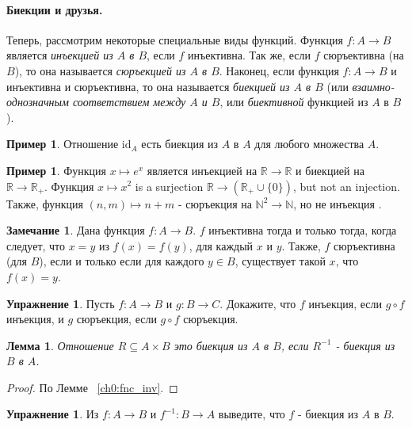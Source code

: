 \documentclass[12pt,notitlepage]{article}
\theoremstyle{plain}
\newtheorem{lemma}[thm]{Лемма}
\theoremstyle{definition}
\newtheorem{exc}[thm]{Упражнение}
\newtheorem{exm}[thm]{Пример}
\newtheorem{rem}[thm]{Замечание}
\theoremstyle{plain}
\newcommand{\N}{\mathbb{N}}
\newcommand{\R}{\mathbb{R}}
\newcommand{\sbs}{\subseteq}
\newcommand{\id}{\mathrm{id}}
\newcommand{\1}{\mathbf{1}}
\newcommand{\0}{\mathbf{0}}
\newcommand{\mcomm}[1]{}
\begin{document}
\paragraph{Биекции и друзья.} Теперь, рассмотрим некоторые специальные виды функций. Функция $f\colon A \to B$ является \emph{инъекцией из $A$ в $B$}, если $f$ инъективна. Так же, если $f$ сюръективна (на $B$), то она называется \emph{сюръекцией из $A$ в $B$}. Наконец, если функция $f\colon A \to B$ и инъективна и сюръективна, то она называется \emph{биекцией из $A$ в $B$} (или \emph{взаимно-однозначным соответствием между $A$ и $B$}, или \emph{биективной} функцией из $A$ в $B$).

\begin{exm}
	Отношение $\id_A$ есть биекция из $A$ в $A$ для любого множества $A$.
\end{exm}

\begin{exm}
	Функция $x \mapsto e^x$ является инъекцией на $\R \to \R$ и биекцией на $\R \to \R_+$. Функция $x \mapsto x^2$ is a surjection $\R \to (\R_+ \cup \{0\})$, but not an injection. Также, функция $(n,m) \mapsto n + m$ - сюръекция на $\N^2 \to \N$, но не инъекция . 
\end{exm}

\begin{rem}
	Дана функция $f\colon A \to B$. $f$ инъективна тогда и только тогда, когда следует, что $x = y$ из $f(x) = f(y)$, для каждый $x$ и $y$. Также, $f$ сюръективна (для $B$), если и только если для каждого $y \in B$, существует такой $x$, что $f(x) = y$.
\end{rem}
\mcomm{This point may be not that obvious for some students. It makes sense to give a detailed proof.}

\begin{exc}
	Пусть $f\colon A \to B$ и $g\colon B \to C$. Докажите, что $f$ инъекция, если $g \circ f$ инъекция, и $g$ сюръекция, если $g \circ f$ сюръекция.
\end{exc}

\begin{lemma}\label{ch0:bi_inv}
	Отношение $R \sbs A \times B$ это биекция из $A$ в $B$, если $R^{-1}$ - биекция из $B$ в $A$.
\end{lemma}
\begin{proof} По Лемме ~\ref{ch0:fnc_inv}.
\end{proof}

\begin{exc}
	Из $f\colon A \to B$ и $f^{-1}\colon B \to A$ выведите, что $f$ - биекция из $A$ в $B$.
\end{exc}
\end{document}
